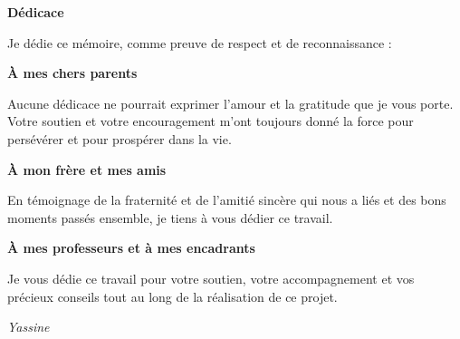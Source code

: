 \documentclass[12pt,a4paper,oneside]{report}
\begin{document}
\clearpage
{}
{}
\vspace*{\fill}

\begin{center}
\Huge\bfseries\color{darkbg} Dédicace
\vspace{1.5cm}

\normalsize\normalfont
Je dédie ce mémoire, comme preuve de respect et de reconnaissance :

\vspace{0.8cm}

\textbf{À mes chers parents}

\vspace{0.3cm}

Aucune dédicace ne pourrait exprimer l'amour et la gratitude que je vous porte. Votre soutien et votre encouragement m'ont toujours donné la force pour persévérer et pour prospérer dans la vie.

\vspace{0.8cm}

\textbf{À mon frère et mes amis}

\vspace{0.3cm}

En témoignage de la fraternité et de l'amitié sincère qui nous a liés et des bons moments passés ensemble, je tiens à vous dédier ce travail.

\vspace{0.8cm}

\textbf{À mes professeurs et à mes encadrants}

\vspace{0.3cm}

Je vous dédie ce travail pour votre soutien, votre accompagnement et vos précieux conseils tout au long de la réalisation de ce projet.
\end{center}

\vspace{0.5cm}

\begin{flushright}
\textit{Yassine}
\end{flushright}

\vspace*{\fill}

\clearpage
{}
{}
\vspace*{\fill}
\end{document}
